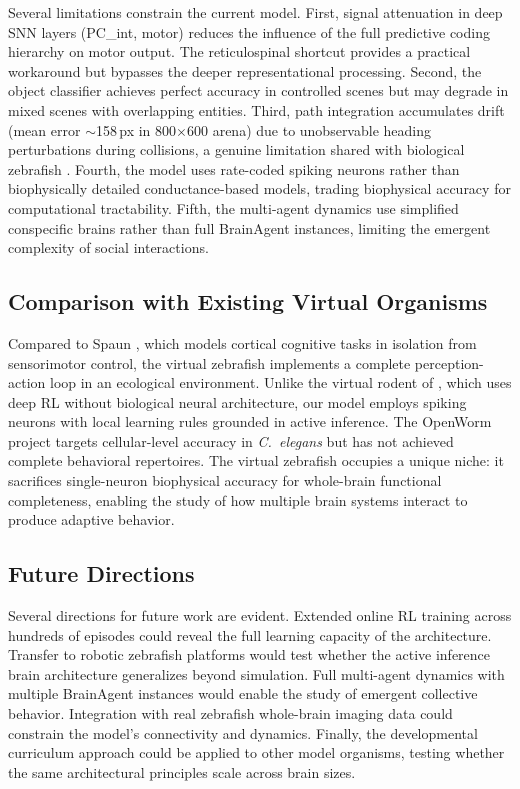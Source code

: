 \documentclass[12pt]{article}
\begin{document}
Several limitations constrain the current model.
First, signal attenuation in deep SNN layers (PC\_int, motor) reduces
the influence of the full predictive coding hierarchy on motor output.
The reticulospinal shortcut provides a practical workaround but
bypasses the deeper representational processing.
Second, the object classifier achieves perfect accuracy in controlled
scenes but may degrade in mixed scenes with overlapping entities.
Third, path integration accumulates drift (mean error $\sim$158\,px
in 800$\times$600 arena) due to unobservable heading perturbations
during collisions, a genuine limitation shared with biological
zebrafish \citep{etienne2004}.
Fourth, the model uses rate-coded spiking neurons rather than
biophysically detailed conductance-based models, trading biophysical
accuracy for computational tractability.
Fifth, the multi-agent dynamics use simplified conspecific brains
rather than full BrainAgent instances, limiting the emergent
complexity of social interactions.

\subsection{Comparison with Existing Virtual Organisms}

Compared to Spaun \citep{eliasmith2012}, which models cortical
cognitive tasks in isolation from sensorimotor control, the virtual
zebrafish implements a complete perception-action loop in an
ecological environment.
Unlike the virtual rodent of \citet{merel2019}, which uses deep RL
without biological neural architecture, our model employs spiking
neurons with local learning rules grounded in active inference.
The OpenWorm project \citep{openworm2014} targets cellular-level
accuracy in \textit{C.\ elegans} but has not achieved complete
behavioral repertoires.
The virtual zebrafish occupies a unique niche: it sacrifices
single-neuron biophysical accuracy for whole-brain functional
completeness, enabling the study of how multiple brain systems
interact to produce adaptive behavior.

\subsection{Future Directions}

Several directions for future work are evident.
Extended online RL training across hundreds of episodes could reveal
the full learning capacity of the architecture.
Transfer to robotic zebrafish platforms would test whether the active
inference brain architecture generalizes beyond simulation.
Full multi-agent dynamics with multiple BrainAgent instances would
enable the study of emergent collective behavior.
Integration with real zebrafish whole-brain imaging data could
constrain the model's connectivity and dynamics.
Finally, the developmental curriculum approach could be applied to
other model organisms, testing whether the same architectural
principles scale across brain sizes.
\end{document}
